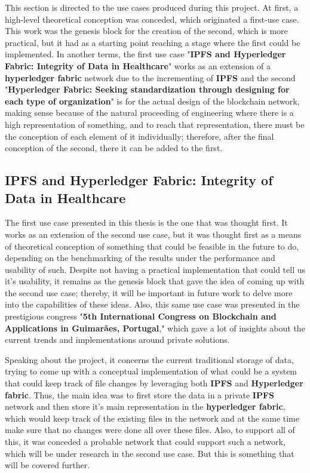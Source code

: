 This section is directed to the use cases produced during this project. At first, a high-level theoretical conception 
was conceded, which originated a first-use case. This work was the genesis block for the creation of the second, which is more practical, but 
it had as a starting point reaching a stage where the first could be implemented. In another terms, the first use case 
"\textbf{IPFS and Hyperledger Fabric: Integrity of Data in Healthcare}" works as an extension of a \textbf{hyperledger fabric} network 
due to the incrementing of \textbf{IPFS} and the second "\textbf{Hyperledger Fabric: Seeking standardization through designing for each 
type of organization}" is for the actual design of the blockchain network, making sense because of the natural proceeding of 
engineering where there is a high representation of something, and to reach that representation, there must be the conception of each 
element of it individually; therefore, after the final conception of the second, there it can be added to the first. 

\subsection{IPFS and Hyperledger Fabric: Integrity of Data in Healthcare}
The first use case presented in this thesis is the one that was thought first. It works as an extension of the second use case, but it was 
thought first as a means of theoretical conception of something that could be feasible in the future to do, depending on the benchmarking 
of the results under the performance and usability of such. Despite not having a practical implementation that could tell us it's 
usability, it remains as the genesis block that gave the idea of coming up with the second use case; thereby, it will be important in 
future work to delve more into the capabilities of these ideas. Also, this same use case was presented in the prestigious 
congress "\textbf{5th International Congress on Blockchain and Applications in Guimarães, Portugal}," which gave a lot of insights about 
the current trends and implementations around private solutions.

Speaking about the project, it concerns the current traditional storage of data, trying to come up with a conceptual implementation of 
what could be a system that could keep track of file changes by leveraging both \textbf{IPFS} and \textbf{Hyperledger fabric}. Thus, 
the main idea was to first store the data in a private \textbf{IPFS} network and then store it's main representation in the 
\textbf{hyperledger fabric}, which would keep track of the existing files in the network and at the same time make sure that no 
changes were done all over these files. Also, to support all of this, it was conceded a probable network that could support such 
a network, which will be under research in the second use case. But this is something that will be covered further.

